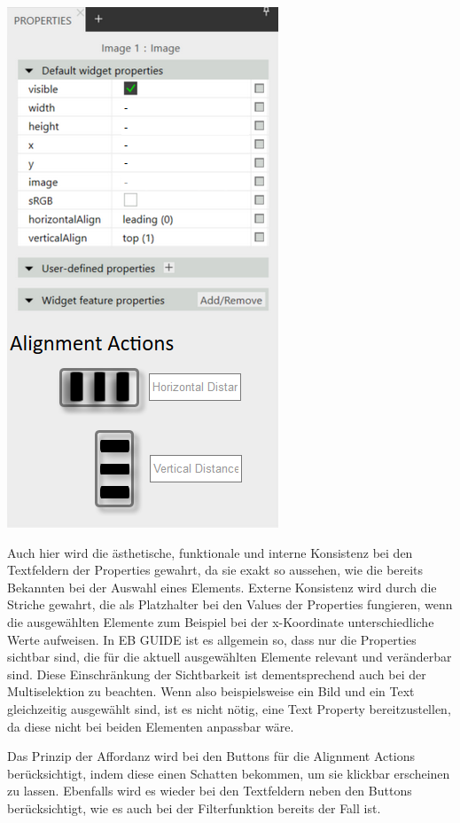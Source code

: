 \begin{center}
  \includegraphics[scale=0.8]{figures/Mehrfachselektion_Adaption02.png}
  \label{fig:Mehrfachselektion_Adaption}
\end{center}

Auch hier wird die ästhetische, funktionale und interne Konsistenz bei den Textfeldern der Properties gewahrt, da sie exakt so aussehen, wie die bereits Bekannten bei der Auswahl eines Elements.
Externe Konsistenz wird durch die Striche gewahrt, die als Platzhalter bei den Values der Properties fungieren, wenn die ausgewählten Elemente zum Beispiel bei der x-Koordinate unterschiedliche Werte aufweisen.
In EB GUIDE ist es allgemein so, dass nur die Properties sichtbar sind, die für die aktuell ausgewählten Elemente relevant und veränderbar sind.
Diese Einschränkung der Sichtbarkeit ist dementsprechend auch bei der Multiselektion zu beachten.
Wenn also beispielsweise ein Bild und ein Text gleichzeitig ausgewählt sind, ist es nicht nötig, eine Text Property bereitzustellen, da diese nicht bei beiden Elementen anpassbar wäre.

Das Prinzip der Affordanz wird bei den Buttons für die Alignment Actions berücksichtigt, indem diese einen Schatten bekommen, um sie klickbar erscheinen zu lassen.
Ebenfalls wird es wieder bei den Textfeldern neben den Buttons berücksichtigt, wie es auch bei der Filterfunktion bereits der Fall ist.

